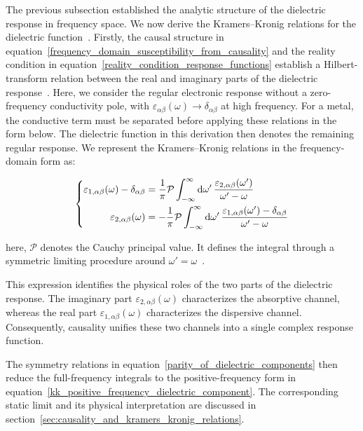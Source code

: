 The previous subsection established the analytic structure of the dielectric response in frequency space.
We now derive the Kramers--Kronig relations for the dielectric function~\cite{toll1956causality}.
Firstly, the causal structure in equation~\eqref{frequency_domain_susceptibility_from_causality} and the reality condition in equation~\eqref{reality_condition_response_functions}
establish a Hilbert-transform relation between the real and imaginary parts of the dielectric response~\cite{stefanski2022analytical,koutserimpas2024time,franta2020symmetry}.
Here, we consider the regular electronic response without a zero-frequency conductivity pole,
with $\varepsilon_{\alpha\beta}(\omega)\to\delta_{\alpha\beta}$ at high frequency.
For a metal, the conductive term must be separated before applying these relations in the form below.
The dielectric function in this derivation then denotes the remaining regular response.
We represent the Kramers--Kronig relations in the frequency-domain form as:

\begin{equation}
\left\{\begin{aligned}
    \varepsilon_{1,\alpha\beta}(\omega)-\delta_{\alpha\beta} &=
    \frac{1}{\mathrm{\pi}}\mathcal{P}
    \int_{-\infty}^{\infty}\mathrm{d}{\omega'}\,
    \frac{\varepsilon_{2,\alpha\beta}(\omega')}{\omega'-\omega} \\
\varepsilon_{2,\alpha\beta}(\omega) &=
    -\frac{1}{\mathrm{\pi}}\mathcal{P}
    \int_{-\infty}^{\infty}\mathrm{d}{\omega'}\,
    \frac{\varepsilon_{1,\alpha\beta}(\omega')-\delta_{\alpha\beta}}{\omega'-\omega}
\end{aligned}\right.
\label{kk_general_dielectric_tensor}
\end{equation}

here, $\mathcal{P}$ denotes the Cauchy principal value.
It defines the integral through a symmetric limiting procedure around $\omega'=\omega$~\cite{stefanski2022analytical,koutserimpas2024time}.

This expression identifies the physical roles of the two parts of the dielectric response.
The imaginary part $\varepsilon_{2,\alpha\beta}(\omega)$ characterizes the absorptive channel, 
whereas the real part $\varepsilon_{1,\alpha\beta}(\omega)$ characterizes the dispersive channel.
Consequently, causality unifies these two channels into a single complex response function.

The symmetry relations in equation~\eqref{parity_of_dielectric_components} then reduce the full-frequency integrals to the positive-frequency form in equation~\eqref{kk_positive_frequency_dielectric_component}.
The corresponding static limit and its physical interpretation are discussed in section~\ref{sec:causality_and_kramers_kronig_relations}.
